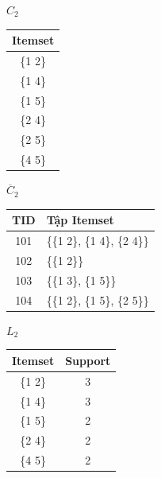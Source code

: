 \documentclass[12pt]{article}
\begin{document}
\begin{figure}[htbp]
    \vspace{0.8cm} %

    \begin{minipage}[t]{0.22\textwidth}
        \centering
        $C_2$\\[4pt]
        \begin{tabular}{|c|}
        \hline
        Itemset \\ \hline
        \{1 2\} \\
        \{1 4\} \\
        \{1 5\} \\
        \{2 4\} \\
        \{2 5\} \\
        \{4 5\} \\ \hline
        \end{tabular}
    \end{minipage}
    \hfill
    \begin{minipage}[t]{0.45\textwidth}
        \centering
        $\overline{C}_2$\\[4pt]
        \begin{tabular}{|c|l|}
        \hline
        TID & Tập Itemset \\ \hline
        101 & \{\{1 2\}, \{1 4\}, \{2 4\}\} \\
        102 & \{\{1 2\}\} \\
        103 & \{\{1 3\}, \{1 5\}\} \\
        104 & \{\{1 2\}, \{1 5\}, \{2 5\}\} \\ \hline
        \end{tabular}
    \end{minipage}
    \hfill
    \begin{minipage}[t]{0.25\textwidth}
        \centering
        $L_2$\\[4pt]
        \begin{tabular}{|c|c|}
        \hline
        Itemset & Support \\ \hline
        \{1 2\} & 3 \\
        \{1 4\} & 3 \\
        \{1 5\} & 2 \\
        \{2 4\} & 2 \\
        \{4 5\} & 2 \\ \hline
        \end{tabular}
    \end{minipage}

    \vspace{0.8cm} %


\end{figure}
\end{document}
